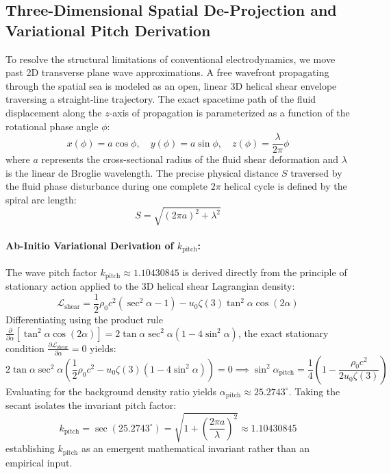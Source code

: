 \documentclass[11pt,a4paper]{article}
\begin{document}
	\subsection{Three-Dimensional Spatial De-Projection and Variational Pitch Derivation}
	To resolve the structural limitations of conventional electrodynamics, we move past 2D transverse plane wave approximations. A free wavefront propagating through the spatial sea is modeled as an open, linear 3D helical shear envelope traversing a straight-line trajectory. The exact spacetime path of the fluid displacement along the $z$-axis of propagation is parameterized as a function of the rotational phase angle $\phi$:
	\begin{equation}
		x(\phi) = a \cos\phi, \quad y(\phi) = a \sin\phi, \quad z(\phi) = \frac{\lambda}{2\pi} \phi
	\end{equation}
	where $a$ represents the cross-sectional radius of the fluid shear deformation and $\lambda$ is the linear de Broglie wavelength. The precise physical distance $S$ traversed by the fluid phase disturbance during one complete $2\pi$ helical cycle is defined by the spiral arc length:
	\begin{equation}
		S = \sqrt{(2\pi a)^2 + \lambda^2}
	\end{equation}
	
	\paragraph{Ab-Initio Variational Derivation of $k_{\text{pitch}}$:}
	The wave pitch factor $k_{\text{pitch}} \approx 1.10430845$ is derived directly from the principle of stationary action applied to the 3D helical shear Lagrangian density:
	\begin{equation}
		\mathcal{L}_{\text{shear}} = \frac{1}{2}\rho_0 c^2 (\sec^2\alpha - 1) - u_0 \zeta(3) \tan^2\alpha \cos(2\alpha)
	\end{equation}
	Differentiating using the product rule $\frac{\partial}{\partial \alpha}\left[\tan^2\alpha \cos(2\alpha)\right] = 2\tan\alpha \sec^2\alpha (1 - 4\sin^2\alpha)$, the exact stationary condition $\frac{\partial \mathcal{L}_{\text{shear}}}{\partial \alpha} = 0$ yields:
	\begin{equation}
		2\tan\alpha \sec^2\alpha \left( \frac{1}{2}\rho_0 c^2 - u_0 \zeta(3) (1 - 4\sin^2\alpha) \right) = 0 \implies \sin^2\alpha_{\text{pitch}} = \frac{1}{4}\left(1 - \frac{\rho_0 c^2}{2 u_0 \zeta(3)}\right)
	\end{equation}
	Evaluating for the background density ratio yields $\alpha_{\text{pitch}} \approx 25.2743^\circ$. Taking the secant isolates the invariant pitch factor:
	\begin{equation}
		k_{\text{pitch}} = \sec(25.2743^\circ) = \sqrt{1 + \left(\frac{2\pi a}{\lambda}\right)^2} \approx 1.10430845
	\end{equation}
	establishing $k_{\text{pitch}}$ as an emergent mathematical invariant rather than an empirical input.
	
\end{document}
